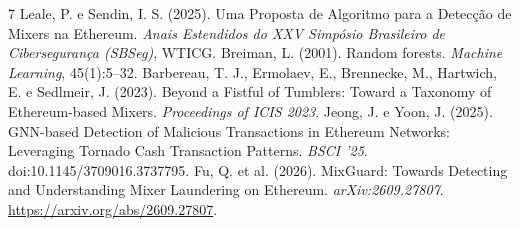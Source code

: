 \documentclass[12pt,a4paper]{article}
\begin{document}
\begin{thebibliography}{7}
 Leale, P. e Sendin, I. S. (2025). Uma Proposta de Algoritmo para a Detecção de Mixers na Ethereum. \emph{Anais Estendidos do XXV Simpósio Brasileiro de Cibersegurança (SBSeg)}, WTICG.
 Breiman, L. (2001). Random forests. \emph{Machine Learning}, 45(1):5--32.
 Barbereau, T. J., Ermolaev, E., Brennecke, M., Hartwich, E. e Sedlmeir, J. (2023). Beyond a Fistful of Tumblers: Toward a Taxonomy of Ethereum-based Mixers. \emph{Proceedings of ICIS 2023}.
 Jeong, J. e Yoon, J. (2025). GNN-based Detection of Malicious Transactions in Ethereum Networks: Leveraging Tornado Cash Transaction Patterns. \emph{BSCI '25}. doi:10.1145/3709016.3737795.
 Fu, Q. et al. (2026). MixGuard: Towards Detecting and Understanding Mixer Laundering on Ethereum. \emph{arXiv:2609.27807}. \url{https://arxiv.org/abs/2609.27807}.
\end{thebibliography}
\end{document}
